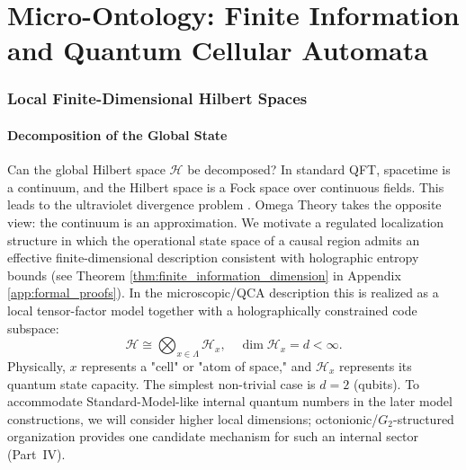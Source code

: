 \part{Micro-Ontology: Finite Information and Quantum Cellular Automata}
\label{part:III}

\section{Local Finite-Dimensional Hilbert Spaces}
\label{chap:local_hilbert}

\subsection{Decomposition of the Global State}
Can the global Hilbert space $\mathcal{H}$ be decomposed? In standard QFT, spacetime is a continuum, and the Hilbert space is a Fock space over continuous fields. This leads to the ultraviolet divergence problem \cite{PeskinSchroeder1995,Haag1996}. Omega Theory takes the opposite view: the continuum is an approximation.
We motivate a regulated localization structure in which the operational state space of a causal region admits an effective finite-dimensional description consistent with holographic entropy bounds (see Theorem \ref{thm:finite_information_dimension} in Appendix \ref{app:formal_proofs}). In the microscopic/QCA description this is realized as a local tensor-factor model together with a holographically constrained code subspace:
\begin{equation}
    \mathcal{H} \cong \bigotimes_{x \in \Lambda} \mathcal{H}_x, \quad \dim \mathcal{H}_x = d < \infty.
\end{equation}
Physically, $x$ represents a "cell" or "atom of space," and $\mathcal{H}_x$ represents its quantum state capacity. The simplest non-trivial case is $d=2$ (qubits). To accommodate Standard-Model-like internal quantum numbers in the later model constructions, we will consider higher local dimensions; octonionic/$G_2$-structured organization provides one candidate mechanism for such an internal sector (Part~IV).

